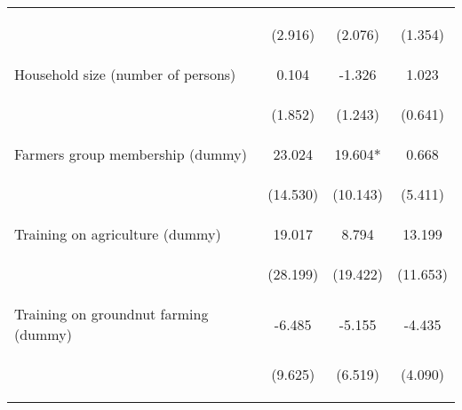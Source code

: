 \begin{center}
\begin{tabular}{lccc}
\vspace{4pt} & \begin{footnotesize}(2.916)\end{footnotesize} & \begin{footnotesize}(2.076)\end{footnotesize} & \begin{footnotesize}(1.354)\end{footnotesize} \\
Household size (number of persons) & 0.104 & -1.326 & 1.023 \\
\vspace{4pt} & \begin{footnotesize}(1.852)\end{footnotesize} & \begin{footnotesize}(1.243)\end{footnotesize} & \begin{footnotesize}(0.641)\end{footnotesize} \\
Farmers group membership (dummy) & 23.024 & 19.604* & 0.668 \\
\vspace{4pt} & \begin{footnotesize}(14.530)\end{footnotesize} & \begin{footnotesize}(10.143)\end{footnotesize} & \begin{footnotesize}(5.411)\end{footnotesize} \\
Training on agriculture (dummy) & 19.017 & 8.794 & 13.199 \\
\vspace{4pt} & \begin{footnotesize}(28.199)\end{footnotesize} & \begin{footnotesize}(19.422)\end{footnotesize} & \begin{footnotesize}(11.653)\end{footnotesize} \\
Training on groundnut farming (dummy) & -6.485 & -5.155 & -4.435 \\
\vspace{4pt} & \begin{footnotesize}(9.625)\end{footnotesize} & \begin{footnotesize}(6.519)\end{footnotesize} & \begin{footnotesize}(4.090)\end{footnotesize} \\

\end{tabular}
\end{center}
